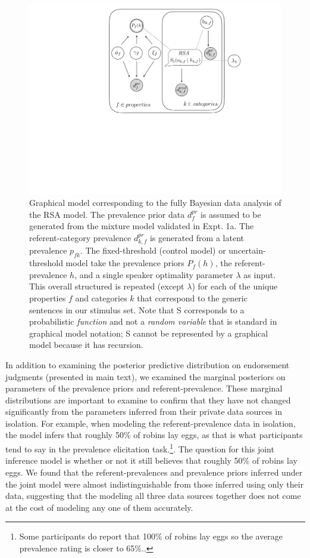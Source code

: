 \documentclass[english,floatsintext,man]{apa6}
\theoremstyle{definition}
\theoremstyle{definition}
\theoremstyle{definition}
\theoremstyle{remark}
\begin{document}
\begin{figure}[htbp]
\centering
\includegraphics{figs/generics_bayesnetmodel.pdf}
\caption{\label{fig:genericsModelDiagram}Graphical model corresponding to
the fully Bayesian data analysis of the RSA model. The prevalence prior
data \(d^{pr}_{f}\) is assumed to be generated from the mixture model
validated in Expt. 1a. The referent-category prevalence \(d^{pr}_{k,f}\)
is generated from a latent prevalence \(p_{fk}\). The fixed-threshold
(control model) or uncertain-threshold model take the prevalence priors
\(P_f(h)\), the referent-prevalence \(h\), and a single speaker
optimality parameter \(\lambda\) as input. This overall structured is
repeated (except \(\lambda\)) for each of the unique properties \(f\)
and categories \(k\) that correspond to the generic sentences in our
stimulus set. Note that S corresponds to a probabilistic \emph{function}
and not a \emph{random variable} that is standard in graphical model
notation; S cannot be represented by a graphical model because it has
recursion.}
\end{figure}

In addition to examining the posterior predictive distribution on
endorsement judgments (presented in main text), we examined the marginal
posteriors on parameters of the prevalence priors and
referent-prevalence. These marginal distributions are important to
examine to confirm that they have not changed significantly from the
parameters inferred from their private data sources in isolation. For
example, when modeling the referent-prevalence data in isolation, the
model infers that roughly 50\% of robins lay eggs, as that is what
participants tend to say in the prevalence elicitation task.\footnote{Some
  participants do report that 100\% of robins lay eggs so the average
  prevalence rating is closer to 65\%..}. The question for this joint
inference model is whether or not it still believes that roughly 50\% of
robins lay eggs. We found that the referent-prevalences and prevalence
priors inferred under the joint model were almost indistinguishable from
those inferred using only their data, suggesting that the modeling all
three data sources together does not come at the cost of modeling any
one of them accurately.
\end{document}
